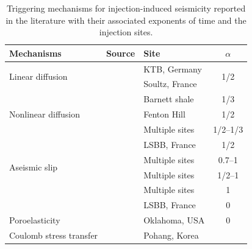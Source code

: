 \documentclass[draft]{agujournal2019}
\begin{document}
\begin{table}[htbp]
	\centering
	\caption{Triggering mechanisms for injection-induced seismicity reported in the literature with their associated exponents of time and the injection sites.}\label{tab:induced-seismicity-mechanisms}
	\begin{tabular}{lllc}
		\toprule
		Mechanisms                           & Source                        & Site           & $\alpha$             \\
		\midrule
		\multirow{2}{*}{Linear diffusion}    & \cite{ShapiroEtAl1997}        & KTB, Germany   & \multirow{2}{*}{1/2} \\
		                                     & \cite{ShapiroEtAl2002}        & Soultz, France                        \\
		\midrule
		\multirow{3}{*}{Nonlinear diffusion} & \cite{ShapiroDinske2009}      & Barnett shale  & 1/3                  \\
		                                     & \cite{HummelMller2009}        & Fenton Hill    & 1/2                  \\
		                                     & \cite{JohannEtAl2016}         & Multiple sites & 1/2--1/3             \\
		\midrule
		\multirow{4}{*}{Aseismic slip}       & \cite{BhattacharyaViesca2019} & LSBB, France   & 1/2                  \\
		                                     & \cite{DeBarrosEtAl2021}       & Multiple sites & 0.7--1               \\
		                                     & \cite{SaezUribe2023}          & Multiple sites & 1/2--1               \\
		                                     & \cite{DanreEtAl2024}          & Multiple sites & 1                    \\
		                                     & \cite{DuboeufEtAl2017}        & LSBB, France   & 0                    \\
		\midrule
		Poroelasticity                       & \cite{GoebelEtAl2017}         & Oklahoma, USA  & 0                    \\
		\midrule
		Coulomb stress transfer              & \cite{YeoEtAl2020}            & Pohang, Korea                         \\
		\bottomrule
	\end{tabular}
\end{table}
\end{document}
